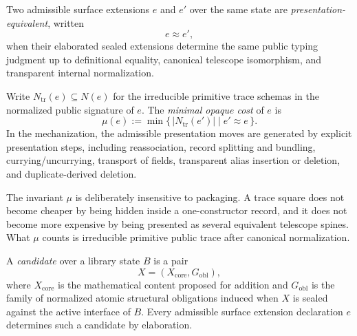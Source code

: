 \begin{definition}
Two admissible surface extensions \(e\) and \(e'\) over the same state are
\emph{presentation-equivalent}, written
\[
  e \approx e',
\]
when their elaborated sealed extensions determine the same public typing judgment up to
definitional equality, canonical telescope isomorphism, and transparent internal
normalization.

Write \(N_{\mathrm{tr}}(e)\subseteq N(e)\) for the irreducible primitive trace schemas in the
normalized public signature of \(e\).  The \emph{minimal opaque cost} of \(e\) is
\[
  \mu(e) := \min\{\, |N_{\mathrm{tr}}(e')| \mid e' \approx e \,\}.
\]
In the mechanization, the admissible presentation moves are generated by explicit
presentation steps, including reassociation, record splitting and bundling,
currying/uncurrying, transport of fields, transparent alias insertion or deletion, and
duplicate-derived deletion.
\end{definition}

The invariant \(\mu\) is deliberately insensitive to packaging.  A trace square does not become
cheaper by being hidden inside a one-constructor record, and it does not become more
expensive by being presented as several equivalent telescope spines.  What \(\mu\) counts is
irreducible primitive public trace after canonical normalization.

\begin{definition}[Candidate]
A \emph{candidate} over a library state \(B\) is a pair
\[
  X=(X_{\mathrm{core}},G_{\mathrm{obl}}),
\]
where \(X_{\mathrm{core}}\) is the mathematical content proposed for addition and
\(G_{\mathrm{obl}}\) is the family of normalized atomic structural obligations induced when
\(X\) is sealed against the active interface of \(B\).  Every admissible surface extension
declaration \(e\) determines such a candidate by elaboration.
\end{definition}


